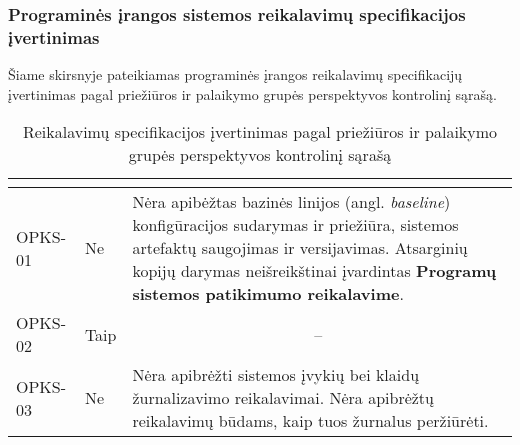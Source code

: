 \documentclass{VUMIFPSkursinis}
\begin{document}
\subsubsection{Programinės įrangos sistemos reikalavimų specifikacijos įvertinimas}

Šiame skirsnyje pateikiamas programinės įrangos reikalavimų specifikacijų įvertinimas pagal priežiūros ir palaikymo grupės perspektyvos kontrolinį sąrašą.
\begin{center}

	\begin{longtable}{|C{2cm}|L{2.5cm}|L{10cm}|}

		\caption{Reikalavimų specifikacijos įvertinimas pagal priežiūros ir palaikymo grupės perspektyvos kontrolinį sąrašą}
		\label{table:VKS}

		\\ \hline
		 &
		 &
		\\ \hline
		OPKS-01                                         &
		Ne                                              &
		Nėra apibėžtas bazinės linijos (angl. \textit{baseline}) konfigūracijos sudarymas ir priežiūra, sistemos artefaktų saugojimas ir versijavimas. Atsarginių kopijų darymas neišreikštinai įvardintas \textbf{Programų sistemos patikimumo reikalavime}.             \\ \hline
		OPKS-02                                         &
		Taip                                            &
		                                                                                                                                                                                                                                           \\ \hline
		OPKS-03                                         &
		Ne                                              &
		Nėra apibrėžti sistemos įvykių bei klaidų žurnalizavimo reikalavimai. Nėra apibrėžtų reikalavimų būdams, kaip tuos žurnalus peržiūrėti.                                                                                                                            \\ \hline

\end{longtable}
\end{center}
\end{document}
